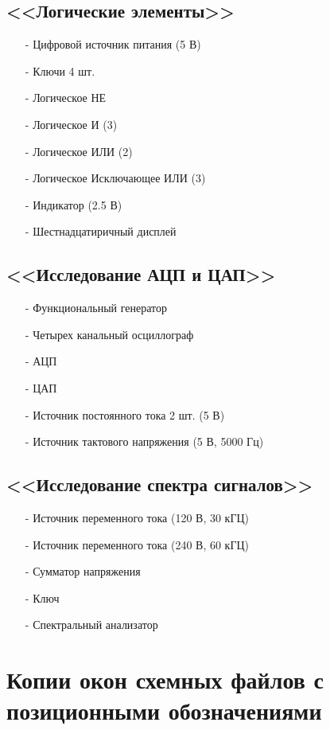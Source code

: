 \documentclass[11pt]{article}
\begin{document}
\subsection{<<Логические элементы>>}
\begin{itemize}
    \item[-] Цифровой источник питания (5 В)
    \item[-] Ключи 4 шт.
    \item[-] Логическое НЕ
    \item[-] Логическое И (3)
    \item[-] Логическое ИЛИ (2)
    \item[-] Логическое Исключающее ИЛИ (3)
    \item[-] Индикатор (2.5 В)
    \item[-] Шестнадцатиричный дисплей
\end{itemize}
\subsection{<<Исследование АЦП и ЦАП>>}
\begin{itemize}
    \item[-] Функциональный генератор
    \item[-] Четырех канальный осциллограф
    \item[-] АЦП
    \item[-] ЦАП
    \item[-] Источник постоянного тока 2 шт. (5 В)
    \item[-] Источник тактового напряжения (5 В, 5000 Гц)
\end{itemize}
\subsection{<<Исследование спектра сигналов>>}
\begin{itemize}
    \item[-] Источник переменного тока (120 В, 30 кГЦ)
    \item[-] Источник переменного тока (240 В, 60 кГЦ)
    \item[-] Сумматор напряжения
    \item[-] Ключ
    \item[-] Спектральный анализатор
\end{itemize}
\section{Копии окон схемных файлов с позиционными обозначениями}
\end{document}
